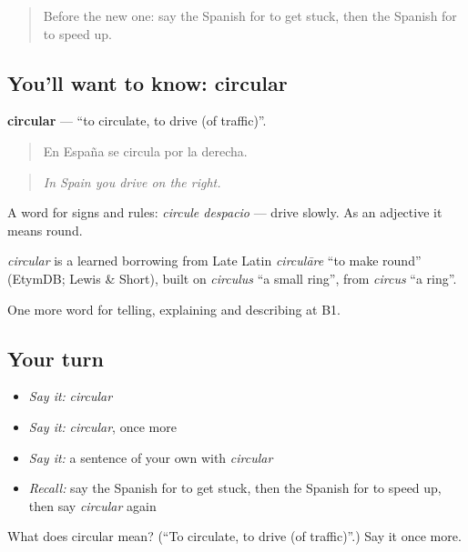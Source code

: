 \label{lesson:ES-C643-circular}



\begin{quote}
Before the new one: say the Spanish for to get stuck, then the Spanish for to speed up.
\end{quote}

\subsection*{You'll want to know: circular}
\textbf{circular} — \textquotedblleft{}to circulate, to drive (of traffic)\textquotedblright{}.

\begin{quote}
En España se circula por la derecha.
\end{quote}

\begin{quote}
\emph{In Spain you drive on the right.}
\end{quote}

A word for signs and rules: \emph{circule despacio} — drive slowly. As an adjective it means round.

\begin{cousinweb}
\emph{circular} is a learned borrowing from Late Latin \emph{circulāre} \textquotedblleft{}to make round\textquotedblright{} (EtymDB; Lewis \& Short), built on \emph{circulus} \textquotedblleft{}a small ring\textquotedblright{}, from \emph{circus} \textquotedblleft{}a ring\textquotedblright{}.
\end{cousinweb}

\begin{grammarlens}[title={What you've built}]
One more word for telling, explaining and describing at B1.
\end{grammarlens}

\subsection*{Your turn}
\begin{itemize}
\raggedright
  \item \emph{Say it:} \emph{circular}
  \item \emph{Say it:} \emph{circular}, once more
  \item \emph{Say it:} a sentence of your own with \emph{circular}
  \item \emph{Recall:} say the Spanish for to get stuck, then the Spanish for to speed up, then say \emph{circular} again
\end{itemize}

\begin{tcolorbox}[breakable,colback=teal!4,colframe=teal!35!black,title={Before you move on}]
What does circular mean? (\textquotedblleft{}To circulate, to drive (of traffic)\textquotedblright{}.) Say it once more.
\end{tcolorbox}
